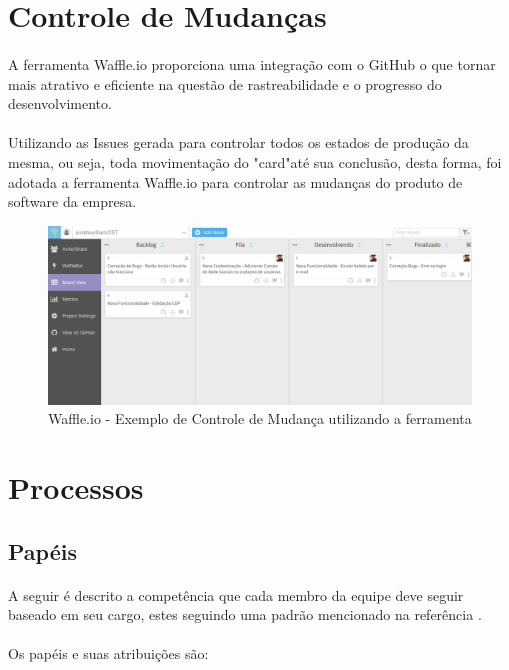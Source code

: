 \documentclass[	DIV=calc,%
							paper=a4,%
							fontsize=12pt,%
							onecolumn]{scrartcl}	 					%
\begin{document}
\section{Controle de Mudanças}
\paragraph{}
A ferramenta Waffle.io proporciona uma integração com o GitHub o que tornar mais atrativo e eficiente na questão de rastreabilidade e o progresso do desenvolvimento. 
\paragraph{}
Utilizando as Issues gerada para controlar todos os estados de produção da mesma, ou seja, toda movimentação do "card"até sua conclusão, desta forma, foi adotada a ferramenta Waffle.io para controlar as mudanças do produto de software da empresa.

\begin{figure}[!h]
	\caption{Waffle.io - Exemplo de Controle de Mudança utilizando a ferramenta}
	\includegraphics[scale=0.36]{waffleio}
\end{figure}

\newpage
\section{Processos}

\subsection{Papéis}
\paragraph{}
A seguir é descrito a competência que cada membro da equipe deve seguir baseado em seu cargo, estes seguindo uma padrão mencionado na referência \cite{pressman1995engenharia}.
\paragraph{}
Os papéis e suas atribuições são:
\end{document}
